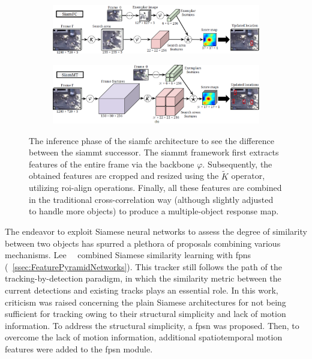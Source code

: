 \begin{figure}[!t]
    \centering
    \begin{subfigure}[b]{\textwidth}
        \centering
        \includegraphics[width=\textwidth]{figures/theoretical_foundations/siammt_orig.png}
        \caption[]{}
    \end{subfigure}
    \begin{subfigure}[b]{\textwidth}
        \centering
        \includegraphics[width=\textwidth]{figures/theoretical_foundations/siammt_new.png}
        \caption[]{}
    \end{subfigure}
    \caption[\Gls{siammt} architecture]{The inference phase of the  \gls{siamfc} architecture to see the difference between the  \gls{siammt} successor. The \gls{siammt} framework first extracts features of the entire frame via the backbone $\varphi$. Subsequently, the obtained features are cropped and resized using the $\tilde{K}$ operator, utilizing \gls{roi}-align operations. Finally, all these features are combined in the traditional cross-correlation way (although slightly adjusted to handle more objects) to produce a multiple-object response map. }
    \label{fig:SiamMTArchitecture}
\end{figure}

The endeavor to exploit Siamese neural networks to assess the degree of similarity between two objects has spurred a plethora of proposals combining various mechanisms. Lee~\etal{}~\cite{lee2019motfpsn} combined Siamese similarity learning with \Glspl{fpn} (\sectiontext{}~\ref{ssec:FeaturePyramidNetworks}). This tracker still follows the path of the tracking-by-detection paradigm, in which the similarity metric between the current detections and existing tracks plays an essential role. In this work, criticism was raised concerning the plain Siamese architectures for not being sufficient for tracking owing to their structural simplicity and lack of motion information. To address the structural simplicity, a \gls{fpsn} was proposed. Then, to overcome the lack of motion information, additional spatiotemporal motion features were added to the \gls{fpsn} module.

